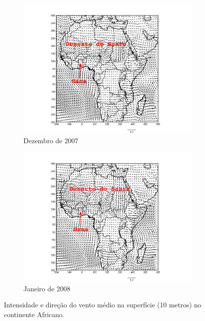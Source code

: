 \begin{figure}[H]
  \centering
  \begin{subfigure}[b]{0.5\linewidth}
    \includegraphics[width=\linewidth]{../inputs/grads/gimp/1000hPa/DEZ_2007.pdf}
    \caption{Dezembro de 2007}
  \end{subfigure}%
  \begin{subfigure}[b]{0.5\linewidth}
    \includegraphics[width=\linewidth]{../inputs/grads/gimp/1000hPa/JAN_2008.pdf}
    \caption{Janeiro de 2008}
  \end{subfigure}
  \caption{Intensidade e direção do vento médio na superfície (10 metros) no 
           continente Africano. \label{fig:ECMWF10} }
\end{figure}


